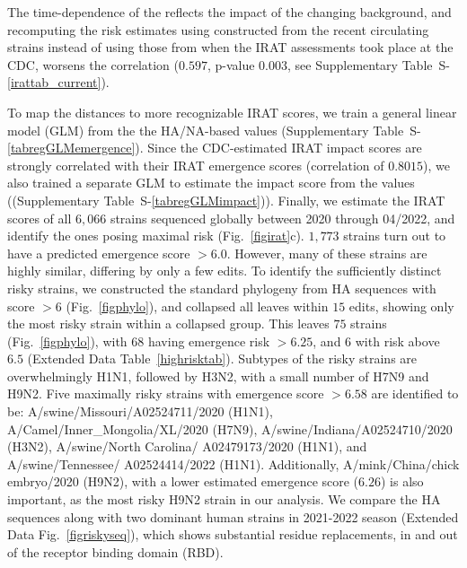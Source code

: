 \documentclass[onecolumn, compsoc,10pt]{IEEEtran}
\def\EXTENDED{Extended Data\xspace}
\def\SUPPLEMENTARY{Supplementary\xspace}
\begin{document}
The time-dependence of the \erisk reflects the impact of the changing background, and recomputing the risk estimates using  constructed from the recent circulating strains instead of using those from when the IRAT assessments took place at the  CDC,  worsens the correlation ($0.597$, p-value $0.003$, see \SUPPLEMENTARY Table~S-\ref{irattab_current}).

To map the \enet distances to  more recognizable IRAT scores, we  train a general linear model (GLM)  from the  the HA/NA-based \erisk values (\SUPPLEMENTARY Table~S-\ref{tabregGLMemergence}). Since the CDC-estimated IRAT impact scores are strongly correlated with their IRAT emergence scores (correlation of $0.8015$), we also trained a separate GLM to estimate the impact score from the \erisk values ((\SUPPLEMENTARY Table~S-\ref{tabregGLMimpact})).  Finally,  we estimate the  IRAT scores of all  $6,066$  \infl strains sequenced globally between 2020 through 04/2022, and identify the ones posing maximal risk (Fig.~\ref{figirat}c). $1,773$ strains turn out to have a predicted emergence score $>6.0$. However, many of these strains are highly similar, differing by only a few edits. To identify the sufficiently distinct risky strains, we constructed the standard phylogeny from  HA sequences with score $>6$ (Fig.~\ref{figphylo}), and collapsed all leaves within $15$ edits, showing only the most risky strain within a collapsed group. This leaves $75$ strains (Fig.~\ref{figphylo}), with $68$ having emergence risk $>6.25$, and $6$ with  risk above $6.5$ (\EXTENDED Table~\ref{highrisktab}). Subtypes of the   risky strains are overwhelmingly H1N1, followed by H3N2, with a  small number of H7N9 and H9N2. Five maximally risky strains with emergence score $>6.58$ are identified to be: 
A/swine/Missouri/A02524711/2020 (H1N1), A/Camel/Inner\_Mongolia/XL/2020 (H7N9), A/swine/Indiana/A02524710/2020 (H3N2), A/swine/North Carolina/ A02479173/2020 (H1N1), and A/swine/Tennessee/ A02524414/2022 (H1N1).  Additionally,  A/mink/China/chick embryo/2020 (H9N2),  with a lower estimated emergence score ($6.26$) is also important, as the most risky H9N2 strain in our analysis. We compare the HA sequences along with two dominant human strains in 2021-2022 season (\EXTENDED Fig.~\ref{figriskyseq}), which shows substantial residue replacements, in and out of the receptor binding domain (RBD).

\end{document}
